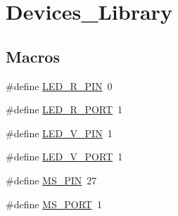 \hypertarget{group__Devices__Library}{}\section{Devices\+\_\+\+Library}
\label{group__Devices__Library}
\subsection*{Macros}
\begin{DoxyCompactItemize}
\item 
\#define \hyperlink{group__Devices__Library_ga22f3cf4ef9dadad8d78d5c59999100b6}{L\+E\+D\+\_\+\+R\+\_\+\+P\+IN}~0
\item 
\#define \hyperlink{group__Devices__Library_ga5a11a7cbc215e25401541277460113a4}{L\+E\+D\+\_\+\+R\+\_\+\+P\+O\+RT}~1
\item 
\#define \hyperlink{group__Devices__Library_gaefaaa0f7c44f79a6150287630f9531d6}{L\+E\+D\+\_\+\+V\+\_\+\+P\+IN}~1
\item 
\#define \hyperlink{group__Devices__Library_gab09c8e054071dd324e1527eadec02adf}{L\+E\+D\+\_\+\+V\+\_\+\+P\+O\+RT}~1
\item 
\#define \hyperlink{group__Devices__Library_ga3ea9ecb7907af23b0d59637a7e778d47}{M\+S\+\_\+\+P\+IN}~27
\item 
\#define \hyperlink{group__Devices__Library_gaf98ad77692941c0b1abe1a1a399bceea}{M\+S\+\_\+\+P\+O\+RT}~1
\end{DoxyCompactItemize}
